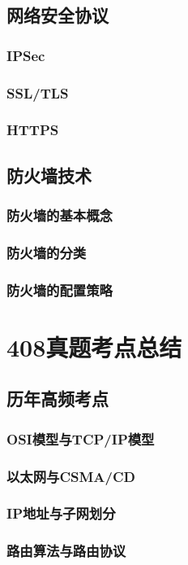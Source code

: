 \documentclass[lang=cn,newtx,10pt,scheme=chinese]{../../elegantbook}
\begin{document}
\section{网络安全协议}
\subsection{IPSec}
\subsection{SSL/TLS}
\subsection{HTTPS}

\section{防火墙技术}
\subsection{防火墙的基本概念}
\subsection{防火墙的分类}
\subsection{防火墙的配置策略}

\chapter{408真题考点总结}

\section{历年高频考点}
\subsection{OSI模型与TCP/IP模型}
\subsection{以太网与CSMA/CD}
\subsection{IP地址与子网划分}
\subsection{路由算法与路由协议}
\end{document}
